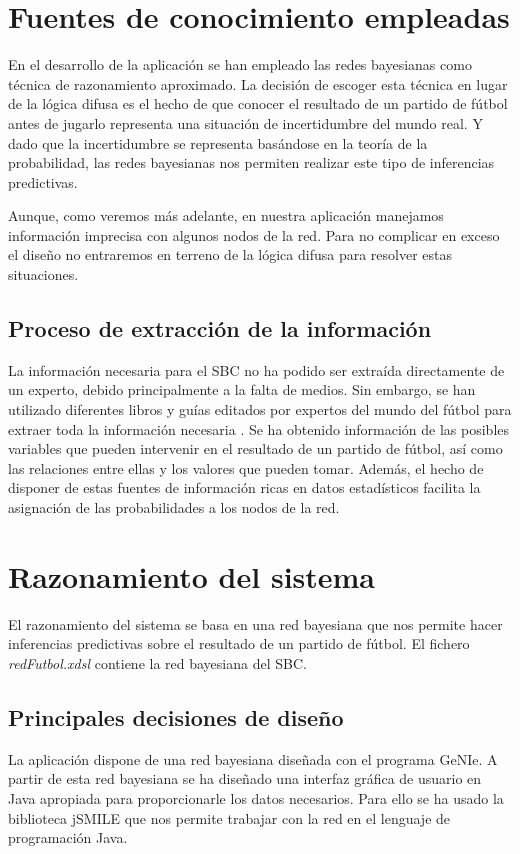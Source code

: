 \documentclass[a4paper,12pt]{article}
\begin{document}
\section{Fuentes de conocimiento empleadas}
\label{sec:conocimiento}
\par
En el desarrollo de la aplicación se han empleado las redes bayesianas como técnica de razonamiento aproximado.
La decisión de escoger esta técnica en lugar de la lógica difusa es el hecho de que conocer el resultado de un partido de fútbol antes de jugarlo representa una situación de incertidumbre del mundo real.
Y dado que la incertidumbre se representa basándose en la teoría de la probabilidad, las redes bayesianas nos permiten realizar este tipo de inferencias predictivas.
\par
Aunque, como veremos más adelante, en nuestra aplicación manejamos información imprecisa con algunos nodos de la red.
Para no complicar en exceso el diseño no entraremos en terreno de la lógica difusa para resolver estas situaciones.

  \subsection{Proceso de extracción de la información}
\par
La información necesaria para el SBC no ha podido ser extraída directamente de un experto, debido principalmente a la falta de medios.
Sin embargo, se han utilizado diferentes libros y guías editados por expertos del mundo del fútbol para extraer toda la información necesaria \cite{GM0910}.
Se ha obtenido información de las posibles variables que pueden intervenir en el resultado de un partido de fútbol, así como las relaciones entre ellas y los valores que pueden tomar.
Además, el hecho de disponer de estas fuentes de información ricas en datos estadísticos facilita la asignación de las probabilidades a los nodos de la red.

\section{Razonamiento del sistema}
\label{sec:razonamiento}
El razonamiento del sistema se basa en una red bayesiana que nos permite hacer inferencias predictivas sobre el resultado de un partido de fútbol.
El fichero \textit{redFutbol.xdsl} contiene la red bayesiana del SBC.

  \subsection{Principales decisiones de diseño}
\par
La aplicación dispone de una red bayesiana diseñada con el programa GeNIe.
A partir de esta red bayesiana se ha diseñado una interfaz gráfica de usuario en Java apropiada para proporcionarle los datos necesarios.
Para ello se ha usado la biblioteca jSMILE que nos permite trabajar con la red en el lenguaje de programación Java.
\end{document}
